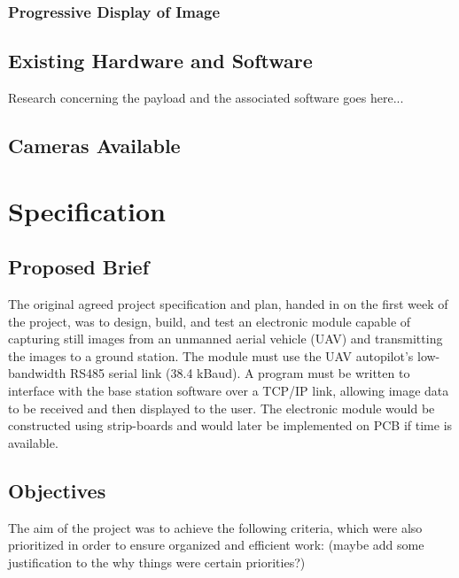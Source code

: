 \documentclass[oneside]{ecsgdp}         %
\begin{document}
\subsection{Progressive Display of Image}

\section{Existing Hardware and Software}
Research concerning the payload and the associated software goes here...

\section{Cameras Available}



\chapter{Specification}

\section{Proposed Brief}
The original agreed project specification and plan, handed in on the first week of the project, was to design, build, and test an electronic module capable of capturing still images from an unmanned aerial vehicle (UAV) and transmitting the images to a ground station. The module must use the UAV autopilot’s low-bandwidth RS485 serial link (38.4 kBaud). A program must be written to interface with the base station software over a TCP/IP link, allowing image data to be received and then displayed to the user. The electronic module would be constructed using strip-boards and would later be implemented on PCB if time is available.


\section{Objectives} 
The aim of the project was to achieve the following criteria, which were also prioritized in order to ensure organized and efficient work: (maybe add some justification to the why things were certain priorities?)
\end{document}
